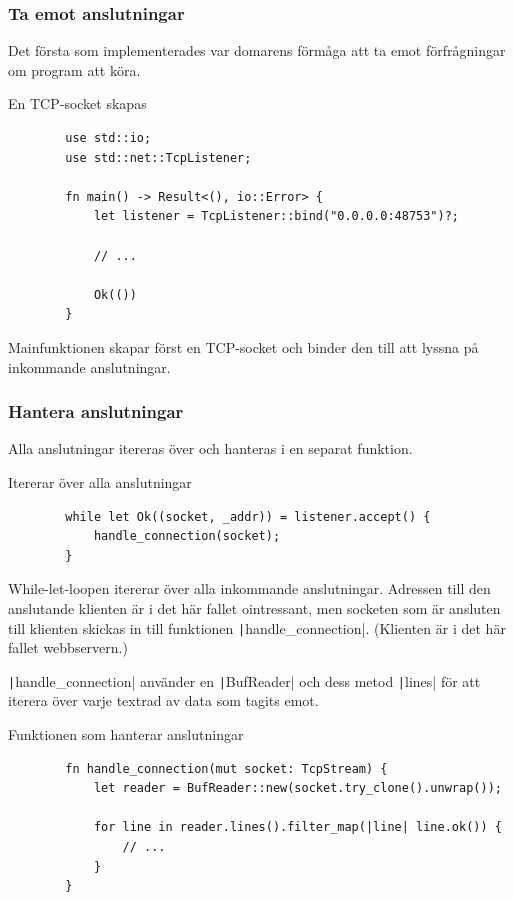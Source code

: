 \documentclass{article}
\begin{document}
\subsubsection{Ta emot anslutningar}

Det första som implementerades var domarens förmåga att ta emot förfrågningar om
program att köra.

\begin{listing}[H]
	\caption{En TCP-socket skapas}
	\begin{verbatim}
		use std::io;
		use std::net::TcpListener;

		fn main() -> Result<(), io::Error> {
			let listener = TcpListener::bind("0.0.0.0:48753")?;

			// ...

			Ok(())
		}
	\end{verbatim}
\end{listing}

Mainfunktionen skapar först en TCP-socket och binder den till att lyssna på
inkommande anslutningar.

\subsubsection{Hantera anslutningar}

Alla anslutningar itereras över och hanteras i en separat funktion.

\begin{listing}[H]
	\caption{Itererar över alla anslutningar}
	\begin{verbatim}
		while let Ok((socket, _addr)) = listener.accept() {
			handle_connection(socket);
		}
	\end{verbatim}
\end{listing}

While-let-loopen itererar över alla inkommande anslutningar.  Adressen till den
anslutande klienten är i det här fallet ointressant, men socketen som är
ansluten till klienten skickas in till funktionen
\texttt|handle_connection|.
(Klienten är i det här fallet webbservern.)

\texttt|handle_connection| använder en
\texttt|BufReader| och dess metod
\texttt|lines| för att iterera över varje textrad av
data som tagits emot.

\begin{listing}[H]
	\caption{Funktionen som hanterar anslutningar}
	\begin{verbatim}
		fn handle_connection(mut socket: TcpStream) {
			let reader = BufReader::new(socket.try_clone().unwrap());

			for line in reader.lines().filter_map(|line| line.ok()) {
				// ...
			}
		}
	\end{verbatim}
\end{listing}
\end{document}
